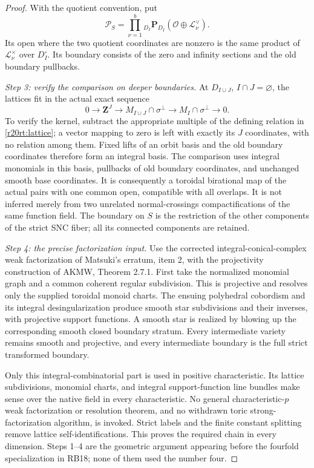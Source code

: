 \begin{proof}
With the quotient convention, put
\[
 \mathcal P_S=
  \prod_{\nu=1}^{b}{}_{D_I}
        \mathbf P_{D_I}(\mathcal O\oplus\mathcal L_\nu^\vee).
 \tag{RT20.10}\label{r20rt:bundleproduct}
\]
Its open where the two quotient coordinates are nonzero
is the same product of $\mathcal L_\nu^\times$ over
$D_I^\circ$.  Its boundary consists of the zero and infinity
sections and the old boundary pullbacks.

\emph{Step 3: verify the comparison on deeper boundaries.}
At $D_{I\cup J}$, $I\cap J=\varnothing$, the lattices fit
in the actual exact sequence
\[
 0\longrightarrow\mathbf Z^J\longrightarrow
 M_{I\cup J}\cap\sigma^\perp\longrightarrow
 M_I\cap\sigma^\perp\longrightarrow0.
 \tag{RT20.11}\label{r20rt:deeper}
\]
To verify the kernel, subtract the appropriate multiple of
the defining relation in \eqref{r20rt:lattice}; a vector
mapping to zero is left with exactly its $J$ coordinates,
with no relation among them.  Fixed lifts of an orbit basis
and the old boundary coordinates therefore form an integral
basis.  The comparison uses integral monomials in this basis,
pullbacks of old boundary coordinates, and unchanged smooth
base coordinates.  It is consequently a toroidal birational
map of the actual pairs with one common open, compatible
with all overlaps.  It is not inferred merely from two
unrelated normal-crossings compactifications of the same
function field.  The boundary on $S$ is the restriction of
the other components of the strict SNC fiber; all its
connected components are retained.

\emph{Step 4: the precise factorization input.}
Use the corrected integral-conical-complex weak factorization
of Matsuki's erratum, item 2, with the projectivity construction
of AKMW, Theorem 2.7.1.  First take the normalized monomial
graph and a common coherent regular subdivision.  This is
projective and resolves only the supplied toroidal monoid
charts.  The ensuing polyhedral cobordism and its integral
desingularization produce smooth star subdivisions and their
inverses, with projective support functions.  A smooth star
is realized by blowing up the corresponding smooth closed
boundary stratum.  Every intermediate variety remains smooth
and projective, and every intermediate boundary is the full
strict transformed boundary.

Only this integral-combinatorial part is used in positive
characteristic.  Its lattice subdivisions, monomial charts,
and integral support-function line bundles make sense over
the native field in every characteristic.  No general
characteristic-$p$ weak factorization or resolution theorem,
and no withdrawn toric strong-factorization algorithm, is
invoked.  Strict labels and the finite constant splitting
remove lattice self-identifications.  This proves the required
chain in every dimension.  Steps 1--4 are the geometric
argument appearing before the fourfold specialization in
RB18; none of them used the number four.
\end{proof}


